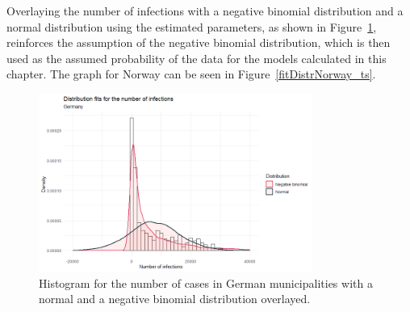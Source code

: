 Overlaying the number of infections with a negative binomial distribution and a normal distribution using the estimated parameters, as shown in Figure~\ref{fitDistrGermany_ts}, reinforces the assumption of the negative binomial distribution, which is then used as the assumed probability of the data for the models calculated in this chapter. The graph for Norway can be seen in Figure~\ref{fitDistrNorway_ts}.
\begin{figure}[H]
  \centering
  \includegraphics[width = 0.8\textwidth]{distrfit_germany_ts.png}  
  \caption{Histogram for the number of cases in German municipalities with a normal and a negative binomial distribution overlayed.}
  \label{fitDistrGermany_ts}
\end{figure}
\clearpage
